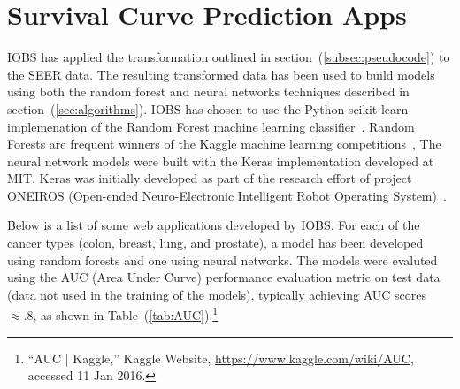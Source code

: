 \documentclass[a4paper,11pt]{article}
\begin{document}

\section{Survival Curve Prediction Apps}

IOBS has  applied the transformation outlined in section~(\ref{subsec:pseudocode}) to the 
SEER data. The resulting transformed data has been used to build models using both the random forest and neural networks techniques described in section~(\ref{sec:algorithms}).
IOBS has chosen to use the Python scikit-learn implemenation of the Random Forest machine learning classifier~\cite{rf}.
Random Forests are frequent winners of the Kaggle machine learning competitions~\cite{kagglerf},
 The neural network models were built with the Keras implementation developed at MIT.
Keras was initially developed as part of the research effort of project ONEIROS (Open-ended Neuro-Electronic Intelligent Robot Operating System)~\cite{keras}.




Below is a list of some web applications developed by IOBS.
For each of the cancer types (colon, breast, lung, and prostate), a model has been developed using random forests and one using neural networks. The models were evaluted using the AUC (Area Under Curve) performance evaluation metric on test data (data not used in the training of the models), typically achieving AUC scores  $\approx .8$, as shown in Table~(\ref{tab:AUC}).\footnote{``AUC | Kaggle,'' Kaggle Website, \url{https://www.kaggle.com/wiki/AUC}, accessed 11 Jan 2016.}
 
\end{document}

